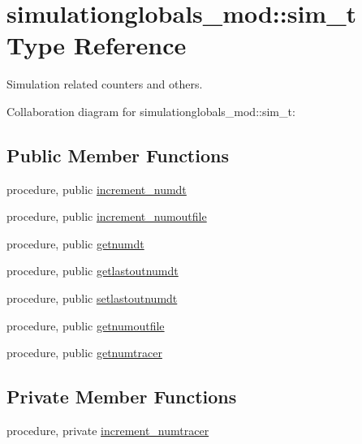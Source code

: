 \hypertarget{structsimulationglobals__mod_1_1sim__t}{}\section{simulationglobals\+\_\+mod\+:\+:sim\+\_\+t Type Reference}
\label{structsimulationglobals__mod_1_1sim__t}


Simulation related counters and others.  




Collaboration diagram for simulationglobals\+\_\+mod\+:\+:sim\+\_\+t\+:
\subsection*{Public Member Functions}
\begin{DoxyCompactItemize}
\item 
procedure, public \mbox{\hyperlink{structsimulationglobals__mod_1_1sim__t_ade3d2bcc84ed41592b0712a0355be108}{increment\+\_\+numdt}}
\item 
procedure, public \mbox{\hyperlink{structsimulationglobals__mod_1_1sim__t_af7f7dad94e8a2de058fe88d0d795aac1}{increment\+\_\+numoutfile}}
\item 
procedure, public \mbox{\hyperlink{structsimulationglobals__mod_1_1sim__t_a4f67d96ae861d1600d365cc86acbc1a7}{getnumdt}}
\item 
procedure, public \mbox{\hyperlink{structsimulationglobals__mod_1_1sim__t_a2b15fdf4d29bcfbac38da1b14644ff3f}{getlastoutnumdt}}
\item 
procedure, public \mbox{\hyperlink{structsimulationglobals__mod_1_1sim__t_a4147b0aec912a4a02d56dcffaad2867c}{setlastoutnumdt}}
\item 
procedure, public \mbox{\hyperlink{structsimulationglobals__mod_1_1sim__t_abdb9a18d07e725c9c99423978f014c4c}{getnumoutfile}}
\item 
procedure, public \mbox{\hyperlink{structsimulationglobals__mod_1_1sim__t_af581a3f3854589b767c95bf4b3d3a388}{getnumtracer}}
\end{DoxyCompactItemize}
\subsection*{Private Member Functions}
\begin{DoxyCompactItemize}
\item 
procedure, private \mbox{\hyperlink{structsimulationglobals__mod_1_1sim__t_afef25e0feaad4ec1cff7afd93bc53812}{increment\+\_\+numtracer}}
\end{DoxyCompactItemize}
